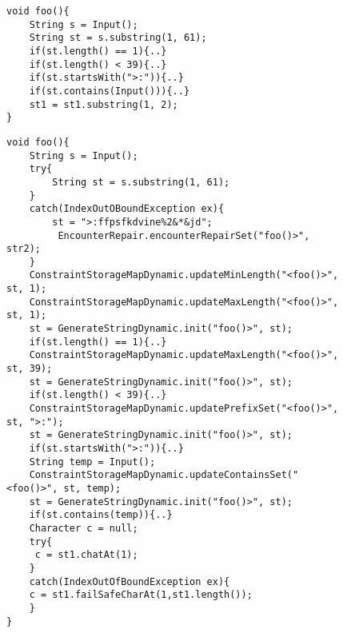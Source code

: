 

\lstset{language=Java, caption=Repairing strategy example, label = snippet:exCode1}
\begin{figure}[t]
\begin{lstlisting}
void foo(){
	String s = Input();
	String st = s.substring(1, 61);	
	if(st.length() == 1){..}
	if(st.length() < 39){..}
	if(st.startsWith(">:")){..}
	if(st.contains(Input())){..}
	st1 = st1.substring(1, 2);
}
\end{lstlisting}
\end{figure}

\lstset{language=Java, caption=Repairing strategy example, label = snippet:exCode2}
\begin{figure}[t]
\begin{lstlisting}
void foo(){
	String s = Input();
	try{
		String st = s.substring(1, 61);
	}
	catch(IndexOutOBoundException ex){
		st = ">:ffpsfkdvine%2&*&jd";
		 EncounterRepair.encounterRepairSet("foo()>", str2);
	}
	ConstraintStorageMapDynamic.updateMinLength("<foo()>", st, 1);
	ConstraintStorageMapDynamic.updateMaxLength("<foo()>", st, 1);
	st = GenerateStringDynamic.init("foo()>", st);	
	if(st.length() == 1){..}
	ConstraintStorageMapDynamic.updateMaxLength("<foo()>", st, 39);
	st = GenerateStringDynamic.init("foo()>", st);
	if(st.length() < 39){..}
	ConstraintStorageMapDynamic.updatePrefixSet("<foo()>", st, ">:");
	st = GenerateStringDynamic.init("foo()>", st);
	if(st.startsWith(">:")){..}
	String temp = Input();
	ConstraintStorageMapDynamic.updateContainsSet("<foo()>", st, temp);
	st = GenerateStringDynamic.init("foo()>", st);
	if(st.contains(temp)){..}
	Character c = null;
	try{
	 c = st1.chatAt(1);
	}
	catch(IndexOutOfBoundException ex){
	c = st1.failSafeCharAt(1,st1.length());
	}
}
\end{lstlisting}
\end{figure}